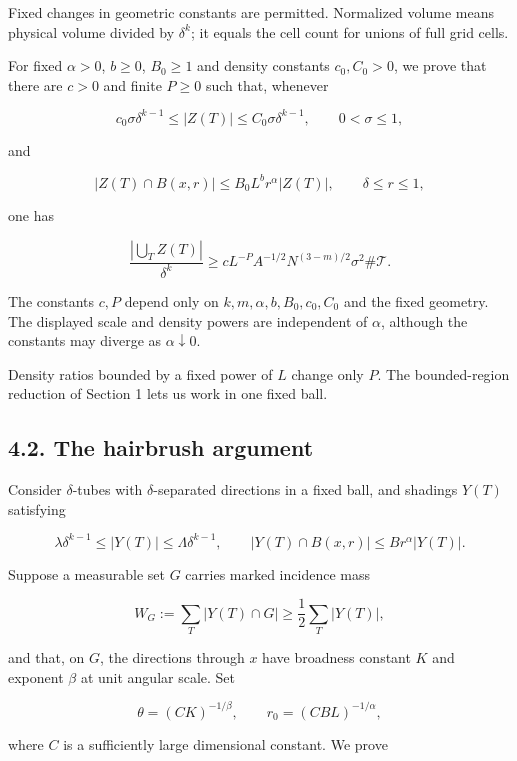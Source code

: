 \documentclass[
  11pt,
  a4paper,
]{article}
\begin{document}
Fixed changes in geometric constants are permitted. Normalized volume
means physical volume divided by \(\delta^k\); it equals the cell count
for unions of full grid cells.

For fixed \(\alpha>0\), \(b\ge0\), \(B_0\ge1\) and density constants
\(c_0,C_0>0\), we prove that there are \(c>0\) and finite \(P\ge0\) such
that, whenever

\[c_0\sigma\delta^{k-1}\le |Z(T)|\le C_0\sigma\delta^{k-1},
 \qquad 0<\sigma\le1,
\tag{4.2}\label{eq:4.2}\]

and

\[|Z(T)\cap B(x,r)|\le B_0L^b r^\alpha |Z(T)|,
 \qquad \delta\le r\le1,
\tag{4.3}\label{eq:4.3}\]

one has

\[\frac{|\bigcup_T Z(T)|}{\delta^k}
 \ge cL^{-P}A^{-1/2}N^{(3-m)/2}\sigma^2\#\mathcal T.
\tag{4.4}\label{eq:4.4}\]

The constants \(c,P\) depend only on \(k,m,\alpha,b,B_0,c_0,C_0\) and
the fixed geometry. The displayed scale and density powers are
independent of \(\alpha\), although the constants may diverge as
\(\alpha\downarrow0\).

Density ratios bounded by a fixed power of \(L\) change only \(P\). The
bounded-region reduction of Section 1 lets us work in one fixed ball.

\hypertarget{the-hairbrush-argument}{%
\subsection{4.2. The hairbrush argument}\label{the-hairbrush-argument}}

Consider \(\delta\)-tubes with \(\delta\)-separated directions in a
fixed ball, and shadings \(Y(T)\) satisfying

\[\lambda\delta^{k-1}\le |Y(T)|\le\Lambda\delta^{k-1},
 \qquad |Y(T)\cap B(x,r)|\le B r^\alpha |Y(T)|.
\tag{4.5}\label{eq:4.5}\]

Suppose a measurable set \(G\) carries marked incidence mass

\[W_G:=\sum_T|Y(T)\cap G|\ge\frac12\sum_T|Y(T)|,
\tag{4.6}\label{eq:4.6}\]

and that, on \(G\), the directions through \(x\) have broadness constant
\(K\) and exponent \(\beta\) at unit angular scale. Set

\[\theta=(C K)^{-1/\beta},\qquad
 r_0=(C B L)^{-1/\alpha},
\tag{4.7}\label{eq:4.7}\]

where \(C\) is a sufficiently large dimensional constant. We prove
\end{document}
